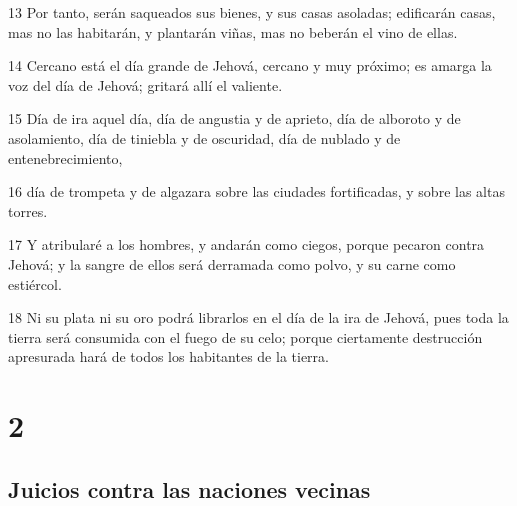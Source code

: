 \par 13 Por tanto, serán saqueados sus bienes, y sus casas asoladas; edificarán casas, mas no las habitarán, y plantarán viñas, mas no beberán el vino de ellas.
\par 14 Cercano está el día grande de Jehová, cercano y muy próximo; es amarga la voz del día de Jehová; gritará allí el valiente.
\par 15 Día de ira aquel día, día de angustia y de aprieto, día de alboroto y de asolamiento, día de tiniebla y de oscuridad, día de nublado y de entenebrecimiento,
\par 16 día de trompeta y de algazara sobre las ciudades fortificadas, y sobre las altas torres.
\par 17 Y atribularé a los hombres, y andarán como ciegos, porque pecaron contra Jehová; y la sangre de ellos será derramada como polvo, y su carne como estiércol.
\par 18 Ni su plata ni su oro podrá librarlos en el día de la ira de Jehová, pues toda la tierra será consumida con el fuego de su celo; porque ciertamente destrucción apresurada hará de todos los habitantes de la tierra.

\chapter{2}

\section*{Juicios contra las naciones vecinas}

